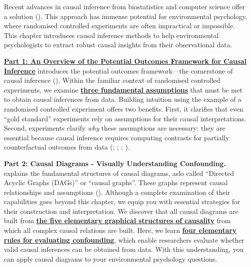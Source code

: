 \documentclass[
  singlecolumn]{article}
\begin{document}
Recent advances in causal inference from biostatistics and computer
science offer a solution (). This approach has immense potential for environmental
psychology, where randomised controlled experiments are often
impractical or impossible. This chapter introduces causal inference
methods to help environmental psychologists to extract robust causal
insights from their observational data.

\hyperref[sec-part1]{\textbf{Part 1: An Overview of the Potential
Outcomes Framework for Causal Inference}} introduces the potential
outcomes framework---the cornerstone of causal inference
(). Within the familiar
context of randomised controlled experiments, we examine
\hyperref[sec-three-fundamental-assumptions]{\textbf{three fundamental
assumptions}} that must be met to obtain causal inferences from data.
Building intuition using the example of a randomised controlled
experiment offers two benefits. First, it clarifies that even ``gold
standard'' experiments rely on assumptions for their causal
interpretations. Second, experiments clarify \emph{why} these
assumptions are necessary: they are essential because causal inference
requires computing contrasts for partially counterfactual outcomes from
data (;
;
;
).

\textbf{Part 2: Causal Diagrams - Visually Understanding Confounding.}
explains the fundamental structures of causal diagrams, aslo called
``Directed Acyclic Graphs (DAGs)'' or ``causal graphs''. These graphs
represent causal relationships and assumptions
(). Although a complete
examination of their capabilities goes beyond this chapter, we equip you
with essential strategies for their construction and interpretation. We
discover that all causal diagrams are built from
\hyperref[sec-five-elementary]{\textbf{the five elementary graphical
structures of causality}} from which all complex causal relations are
built. Here, we learn \hyperref[sec-four-rules]{\textbf{four elementary
rules for evaluating confounding}}, which enable researchers evaluate
whether valid causal inferences can be obtained from data. With this
understanding, you can apply causal diagrams to your environmental
psychology questions.
\end{document}
